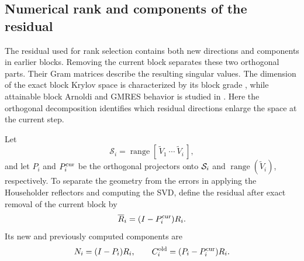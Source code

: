 \documentclass[11pt]{article}
\theoremstyle{definition}
\begin{document}
\subsection{Numerical rank and components of the residual}

The residual used for rank selection contains both new directions and
components in earlier blocks.  Removing the current block separates these
two orthogonal parts.  Their Gram matrices describe the resulting singular
values.
The dimension of the exact block Krylov space is characterized by its block
grade \cite{GutknechtSchmelzer2009}, while attainable block Arnoldi and
GMRES behavior is studied in \cite{KubinovaSoodhalter2020}.  Here the
orthogonal decomposition identifies which residual directions enlarge the
space at the current step.

Let
\[
 \mathcal S_i=\operatorname{range}
 [\,\widetilde V_1\ \cdots\ \widetilde V_i\,],
\]
and let $P_i$ and $P_i^{\rm cur}$ be the orthogonal projectors onto
${\cal S}_i$ and $\operatorname{range}(\widetilde V_i)$, respectively.  To
separate the geometry from the errors in applying the Householder reflectors
and computing the SVD, define the residual after exact removal of the current
block by
\[
 \overline R_i=(I-P_i^{\rm cur})R_i.
\]
Its new and previously computed components are
\begin{equation}
 N_i=(I-P_i)R_i,
 \qquad
 C_i^{\rm old}=(P_i-P_i^{\rm cur})R_i.
 \label{eq:new-old-components}
\end{equation}
\end{document}

